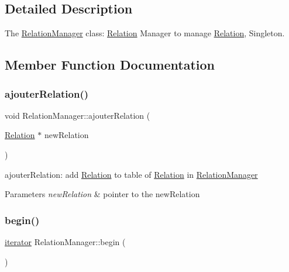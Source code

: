 \subsection{Detailed Description}
The \hyperlink{class_relation_manager}{Relation\+Manager} class\+: \hyperlink{class_relation}{Relation} Manager to manage \hyperlink{class_relation}{Relation}, Singleton. 

\subsection{Member Function Documentation}
\mbox{\label{class_relation_manager_a6661d400acae8992ce2d0677f7bb8bb7}} 
\subsubsection{\texorpdfstring{ajouter\+Relation()}{ajouterRelation()}}
{\footnotesize\ttfamily void Relation\+Manager\+::ajouter\+Relation (\begin{DoxyParamCaption}\item[{\hyperlink{class_relation}{Relation} $\ast$}]{new\+Relation }\end{DoxyParamCaption})}



ajouter\+Relation\+: add \hyperlink{class_relation}{Relation} to table of \hyperlink{class_relation}{Relation} in \hyperlink{class_relation_manager}{Relation\+Manager} 


\begin{DoxyParams}{Parameters}
{\em new\+Relation} & pointer to the new\+Relation \\
\hline
\end{DoxyParams}
\mbox{\label{class_relation_manager_a0cbea7cf6799fb13153d1fab8b345487}} 
\subsubsection{\texorpdfstring{begin()}{begin()}}
{\footnotesize\ttfamily \hyperlink{class_relation_manager_1_1iterator}{iterator} Relation\+Manager\+::begin (\begin{DoxyParamCaption}{ }\end{DoxyParamCaption})\hspace{0.3cm}{\ttfamily [inline]}}




